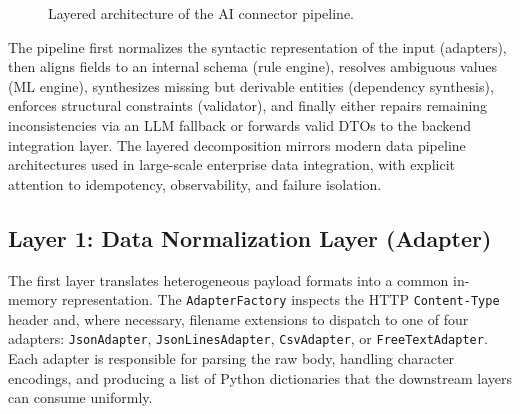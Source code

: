 \documentclass{article}
\begin{document}
\begin{figure}[H]
  \centering
  \caption{Layered architecture of the AI connector pipeline.}
  \label{fig:connector-architecture}
\end{figure}

The pipeline first normalizes the syntactic representation of the input (adapters), then aligns
fields to an internal schema (rule engine), resolves ambiguous values (ML engine), synthesizes
missing but derivable entities (dependency synthesis), enforces structural constraints
(validator), and finally either repairs remaining inconsistencies via an LLM fallback or
forwards valid DTOs to the backend integration layer.\autocite{montecarlo2025pipeline}
The layered decomposition mirrors modern data pipeline architectures used in large-scale
enterprise data integration, with explicit attention to idempotency, observability, and failure
isolation.\autocite{nexla2024enterprise}

\subsection{Layer 1: Data Normalization Layer (Adapter)}
The first layer translates heterogeneous payload formats into a common in-memory
representation.
The \texttt{AdapterFactory} inspects the HTTP \texttt{Content-Type} header and, where
necessary, filename extensions to dispatch to one of four adapters: \texttt{JsonAdapter},
\texttt{JsonLinesAdapter}, \texttt{CsvAdapter}, or
\texttt{FreeTextAdapter}.\autocite{skyvia2026patterns}
Each adapter is responsible for parsing the raw body, handling character encodings, and
producing a list of Python dictionaries that the downstream layers can consume uniformly.
\end{document}
